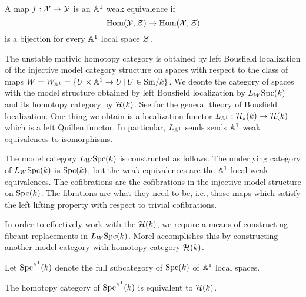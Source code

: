 \documentclass{amsart}%
\begin{document}
\begin{definition}
  A map $f: \mathcal{X} \to \mathcal{Y}$ is an $\mathbb{A}^1$ weak equivalence if 
  \begin{equation*}
    \operatorname{Hom}(\mathcal{Y}, \mathcal{Z}) \to \operatorname{Hom}(\mathcal{X}, \mathcal{Z})
  \end{equation*}
  is a bijection for every $\mathbb{A}^1$ local space $\mathcal{Z}$.
\end{definition}

The unstable motivic homotopy category is obtained by left Bousfield
localization of the injective model category structure on spaces with
respect to the class of maps
$W = W_{\mathbb{A}^1} = \{ U \times \mathbb{A}^1 \to U \, \vert \, U \in \mathrm{Sm}/k\}$. We
deonte the category of spaces with the model structure obtained by
left Bousfield localization by $L_W\mathrm{Spc}(k)$ and its homotopy category
by $\mathcal{H}(k)$. See %
\cite[Chapter 3]{Hhorn} for the general theory of Bousfield
localization. One thing we obtain is a localization functor
$L_{\mathbb{A}^1} : \mathcal{H}_s(k) \to \mathcal{H}(k)$ which is a left Quillen
functor.  In particular, $L_{\mathbb{A}^1}$ sends sends $\mathbb{A}^1$ weak
equivalences to isomorphisms.

The model category $L_W\mathrm{Spc}(k)$ is constructed as follows. The
underlying category of $L_W\mathrm{Spc}(k)$ is $\mathrm{Spc}(k)$, but the weak
equivalences are the $\mathbb{A}^1$-local weak equivalences. The
cofibrations are the cofibrations in the injective model structure on
$\mathrm{Spc}(k)$. The fibrations are what they need to be, i.e., those maps
which satisfy the left lifting property with respect to trivial
cofibrations.

In order to effectively work with the $\mathcal{H}(k)$, we require a means
of constructing fibrant replacements in $L_W\mathrm{Spc}(k)$. Morel
accomplishes this by constructing another model category with homotopy
category $\mathcal{H}(k)$. 

\begin{definition}
  Let $\mathrm{Spc}^{\mathbb{A}^1}(k)$ denote the full subcategory of $\mathrm{Spc}(k)$ of
  $\mathbb{A}^1$ local spaces. 
\end{definition}

\begin{proposition}
  The homotopy category of $\mathrm{Spc}^{\mathbb{A}^1}(k)$ is equivalent to
  $\mathcal{H}(k)$. 
\end{proposition}

\end{document}
